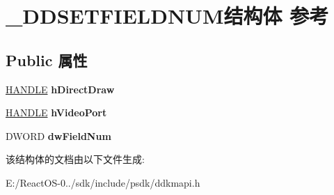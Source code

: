 \hypertarget{struct___d_d_s_e_t_f_i_e_l_d_n_u_m}{}\section{\+\_\+\+D\+D\+S\+E\+T\+F\+I\+E\+L\+D\+N\+U\+M结构体 参考}
\label{struct___d_d_s_e_t_f_i_e_l_d_n_u_m}
\subsection*{Public 属性}
\begin{DoxyCompactItemize}
\item 
\mbox{\label{struct___d_d_s_e_t_f_i_e_l_d_n_u_m_ad65822aa0b92cf32b1f6199435844ac8}} 
\hyperlink{interfacevoid}{H\+A\+N\+D\+LE} {\bfseries h\+Direct\+Draw}
\item 
\mbox{\label{struct___d_d_s_e_t_f_i_e_l_d_n_u_m_a1be05f1cf0bae879feeae1977f6c74ee}} 
\hyperlink{interfacevoid}{H\+A\+N\+D\+LE} {\bfseries h\+Video\+Port}
\item 
\mbox{\label{struct___d_d_s_e_t_f_i_e_l_d_n_u_m_aea81fff0dd44b2878f9f414796e4aeb0}} 
D\+W\+O\+RD {\bfseries dw\+Field\+Num}
\end{DoxyCompactItemize}


该结构体的文档由以下文件生成\+:\begin{DoxyCompactItemize}
\item 
E\+:/\+React\+O\+S-\/0../sdk/include/psdk/ddkmapi.\+h\end{DoxyCompactItemize}
